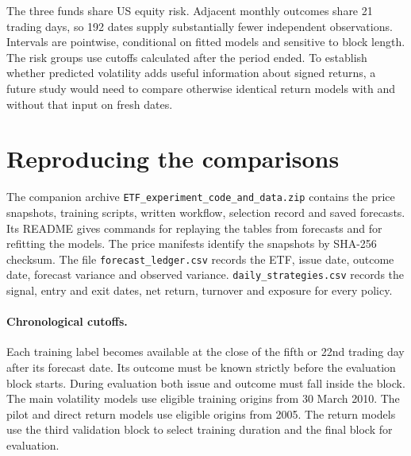 \documentclass[11pt]{article}
\begin{document}
The three funds share US equity risk. Adjacent monthly outcomes share 21 trading days, so 192 dates supply substantially fewer independent observations. Intervals are pointwise, conditional on fitted models and sensitive to block length. The risk groups use cutoffs calculated after the period ended. To establish whether predicted volatility adds useful information about signed returns, a future study would need to compare otherwise identical return models with and without that input on fresh dates.
\section{Reproducing the comparisons}
The companion archive \texttt{ETF\_experiment\_code\_and\_data.zip} contains the price snapshots, training scripts, written workflow, selection record and saved forecasts. Its README gives commands for replaying the tables from forecasts and for refitting the models. The price manifests identify the snapshots by SHA-256 checksum. The file \texttt{forecast\_ledger.csv} records the ETF, issue date, outcome date, forecast variance and observed variance. \texttt{daily\_strategies.csv} records the signal, entry and exit dates, net return, turnover and exposure for every policy.

\paragraph{Chronological cutoffs.} Each training label becomes available at the close of the fifth or 22nd trading day after its forecast date. Its outcome must be known strictly before the evaluation block starts. During evaluation both issue and outcome must fall inside the block. The main volatility models use eligible training origins from 30 March 2010. The pilot and direct return models use eligible origins from 2005. The return models use the third validation block to select training duration and the final block for evaluation.
\end{document}
